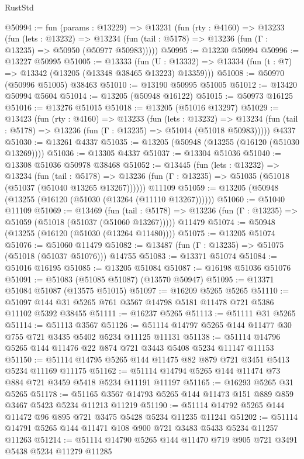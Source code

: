 \begin{lexlean}{RustStd}
\begin{coremodule}
@50994 := fun (params : @13229) =>
  @13231
    (fun (rty : @4160) =>
    @13233
      (fun (lets : @13232) =>
      @13234 (fun (tail : @5178) => @13236 (fun (Γ : @13235) => @50950 (@50977 @50983)))))
@50995 := @13230 @50994
@50996 := @13227 @50995
@51005 := @13333
    (fun (U : @13332) => @13334 (fun (t : @7) => @13342 (@13205 (@13348 @38465 @13223) @13359)))
@51008 := @50970 (@50996 @51005) @38463
@51010 := @13190 @50995 @51005
@51012 := @13420 @50994 @5604
@51014 := @13205 (@50948 @16122)
@51015 := @50973 @16125
@51016 := @13276 @51015
@51018 := @13205 (@51016 @13297)
@51029 := @13423
    (fun (rty : @4160) =>
    @13233
      (fun (lets : @13232) =>
      @13234 (fun (tail : @5178) => @13236 (fun (Γ : @13235) => @51014 (@51018 @50983)))))
    @4337
@51030 := @13261 @4337
@51035 := @13205 (@50948 (@13255 (@16120 (@51030 @13269))))
@51036 := @13305 @4337
@51037 := @13304 @51036
@51040 := @13308 @51036 @50978 @38468
@51052 := @13445
    (fun (lets : @13232) =>
    @13234
      (fun (tail : @5178) =>
      @13236 (fun (Γ : @13235) => @51035 (@51018 (@51037 (@51040 @13265 @13267))))))
    @11109
@51059 := @13205 (@50948 (@13255 (@16120 (@51030 (@13264 (@11110 @13267))))))
@51060 := @51040 @11109
@51069 := @13469
    (fun (tail : @5178) => @13236 (fun (Γ : @13235) => @51059 (@51018 (@51037 (@51060 @13267)))))
    @11479
@51074 := @50948 (@13255 (@16120 (@51030 (@13264 @11480))))
@51075 := @13205 @51074
@51076 := @51060 @11479
@51082 := @13487 (fun (Γ : @13235) => @51075 (@51018 (@51037 @51076))) @14755
@51083 := @13371 @51074
@51084 := @51016 @16195
@51085 := @13205 @51084
@51087 := @16198 @51036 @51076
@51091 := @51083 (@51085 @51087) (@13570 @50947)
@51095 := @13371 @51084 @51087 (@13575 @51015)
@51097 := @16209 @5265 @5265
@51110 := @51097 @144 @31 @5265 @761 @3567 @14798 @5181 @11478 @721 @5386 @11102 @5392 @38455
@51111 := @16237 @5265
@51113 := @51111 @31 @5265
@51114 := @51113 @3567
@51126 := @51114 @14797 @5265 @144 @11477 @30 @755 @721 @3435 @5402 @5234 @11125 @11131
@51138 := @51114 @14796 @5265 @144 @11476 @22 @874 @721 @3443 @5408 @5234 @11147 @11153
@51150 := @51114 @14795 @5265 @144 @11475 @82 @879 @721 @3451 @5413 @5234 @11169 @11175
@51162 := @51114 @14794 @5265 @144 @11474 @73 @884 @721 @3459 @5418 @5234 @11191 @11197
@51165 := @16293 @5265 @31 @5265
@51178 := @51165 @3567 @14793 @5265 @144 @11473 @151 @889 @859 @3467 @5423 @5234 @11213 @11219
@51190 := @51114 @14792 @5265 @144 @11472 @96 @895 @721 @3475 @5428 @5234 @11235 @11241
@51202 := @51114 @14791 @5265 @144 @11471 @108 @900 @721 @3483 @5433 @5234 @11257 @11263
@51214 := @51114 @14790 @5265 @144 @11470 @719 @905 @721 @3491 @5438 @5234 @11279 @11285

\end{coremodule}
\end{lexlean}
